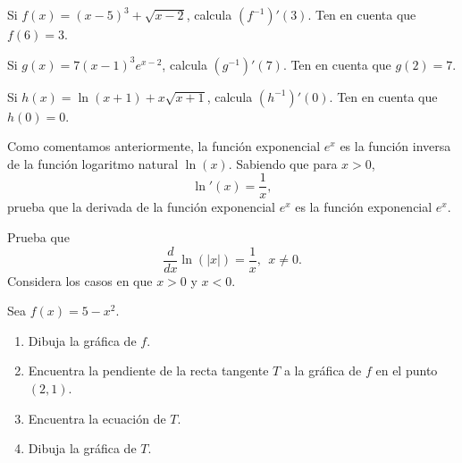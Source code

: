\documentclass[12pt,a4paper]{book}
\begin{document}
    \begin{ejercicio}\label{ej:242}
        Si $f(x)=(x-5)^{3}+\sqrt{x-2}$, calcula $\left(f^{-1}\right)'(3)$. Ten en cuenta
        que $f(6)=3$.
    \end{ejercicio}

    \begin{ejercicio}\label{ej:243}
        Si $g(x)=7(x-1)^{3}e^{x-2}$, calcula $\left(g^{-1}\right)'(7)$. Ten en cuenta
        que $g(2)=7$.
    \end{ejercicio}

    \begin{ejercicio}\label{ej:244}
        Si $h(x)=\ln(x+1)+x\sqrt{x+1}$, calcula $\left(h^{-1}\right)'(0)$. Ten en
        cuenta que $h(0)=0$.
    \end{ejercicio}

    \begin{ejercicio}\label{ej:245}
        Como comentamos
        anteriormente, la función exponencial $e^{x}$ es la función inversa de la función
        logaritmo natural $\ln(x)$. Sabiendo que para $x>0$,
        \begin{equation*}
            \ln'(x)=\frac{1}{x},
        \end{equation*}
        prueba que la derivada de la función exponencial $e^{x}$ es la función exponencial
        $e^{x}$.
    \end{ejercicio}

    \begin{ejercicio}\label{ej:246}
        Prueba que
        \begin{equation*}
            \frac{d}{dx}\ln(|x|)=\frac{1}{x},\ \ x\neq 0.
        \end{equation*}
        \sugerencia Considera los casos en que $x>0$ y $x<0$.
    \end{ejercicio}

    \begin{ejercicio}\label{ej:247}
        Sea $f(x)=5-x^{2}$.
        \begin{enumerate}[nosep]
            \item Dibuja la gráfica de $f$.
            \item Encuentra la pendiente de la recta tangente $T$ a la gráfica de $f$ en el punto
            $(2,1)$.
            \item Encuentra la ecuación de $T$.
            \item Dibuja la gráfica de $T$.
        \end{enumerate}
    \end{ejercicio}
\end{document}
